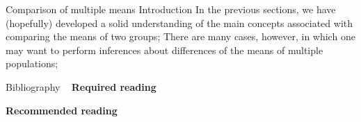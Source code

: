 \documentclass[t]{beamer}
\begin{document}

\begin{ftst}
{Comparison of multiple means}
{Introduction}
In the previous sections, we have (hopefully) developed a solid understanding of the main concepts associated with comparing the means of two groups;
\vone
There are many cases, however, in which one may want to perform inferences about differences of the means of multiple populations;
\vone

\end{ftst}




\begin{ftst}
{Bibliography}
{\ }
\scriptsize
\textbf{Required reading}

\benums  %
\eenum

\textbf{Recommended reading}

\benums %
\item %
\eenum
\end{ftst}

\end{document}
